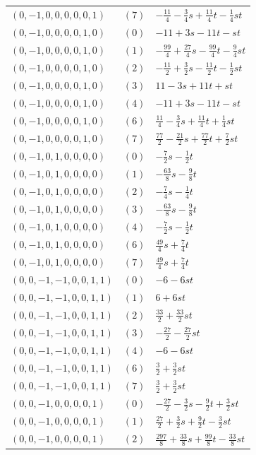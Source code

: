 \begin{longtable}{@{}lll@{}}
$(0,-1,0,0,0,0,0,1)$ & $(7)$ & $-\frac{11}{4}-\frac{3}{4}s+\frac{11}{4}t-\frac{1}{4}st$\\
$(0,-1,0,0,0,0,1,0)$ & $(0)$ & $-11+3s-11t-st$\\
$(0,-1,0,0,0,0,1,0)$ & $(1)$ & $-\frac{99}{4}+\frac{27}{4}s-\frac{99}{4}t-\frac{9}{4}st$\\
$(0,-1,0,0,0,0,1,0)$ & $(2)$ & $-\frac{11}{2}+\frac{3}{2}s-\frac{11}{2}t-\frac{1}{2}st$\\
$(0,-1,0,0,0,0,1,0)$ & $(3)$ & $11-3s+11t+st$\\
$(0,-1,0,0,0,0,1,0)$ & $(4)$ & $-11+3s-11t-st$\\
$(0,-1,0,0,0,0,1,0)$ & $(6)$ & $\frac{11}{4}-\frac{3}{4}s+\frac{11}{4}t+\frac{1}{4}st$\\
$(0,-1,0,0,0,0,1,0)$ & $(7)$ & $\frac{77}{2}-\frac{21}{2}s+\frac{77}{2}t+\frac{7}{2}st$\\
$(0,-1,0,1,0,0,0,0)$ & $(0)$ & $-\frac{7}{2}s-\frac{1}{2}t$\\
$(0,-1,0,1,0,0,0,0)$ & $(1)$ & $-\frac{63}{8}s-\frac{9}{8}t$\\
$(0,-1,0,1,0,0,0,0)$ & $(2)$ & $-\frac{7}{4}s-\frac{1}{4}t$\\
$(0,-1,0,1,0,0,0,0)$ & $(3)$ & $-\frac{63}{8}s-\frac{9}{8}t$\\
$(0,-1,0,1,0,0,0,0)$ & $(4)$ & $-\frac{7}{2}s-\frac{1}{2}t$\\
$(0,-1,0,1,0,0,0,0)$ & $(6)$ & $\frac{49}{4}s+\frac{7}{4}t$\\
$(0,-1,0,1,0,0,0,0)$ & $(7)$ & $\frac{49}{4}s+\frac{7}{4}t$\\
$(0,0,-1,-1,0,0,1,1)$ & $(0)$ & $-6-6st$\\
$(0,0,-1,-1,0,0,1,1)$ & $(1)$ & $6+6st$\\
$(0,0,-1,-1,0,0,1,1)$ & $(2)$ & $\frac{33}{2}+\frac{33}{2}st$\\
$(0,0,-1,-1,0,0,1,1)$ & $(3)$ & $-\frac{27}{2}-\frac{27}{2}st$\\
$(0,0,-1,-1,0,0,1,1)$ & $(4)$ & $-6-6st$\\
$(0,0,-1,-1,0,0,1,1)$ & $(6)$ & $\frac{3}{2}+\frac{3}{2}st$\\
$(0,0,-1,-1,0,0,1,1)$ & $(7)$ & $\frac{3}{2}+\frac{3}{2}st$\\
$(0,0,-1,0,0,0,0,1)$ & $(0)$ & $-\frac{27}{2}-\frac{3}{2}s-\frac{9}{2}t+\frac{3}{2}st$\\
$(0,0,-1,0,0,0,0,1)$ & $(1)$ & $\frac{27}{2}+\frac{3}{2}s+\frac{9}{2}t-\frac{3}{2}st$\\
$(0,0,-1,0,0,0,0,1)$ & $(2)$ & $\frac{297}{8}+\frac{33}{8}s+\frac{99}{8}t-\frac{33}{8}st$\\

\end{longtable}
